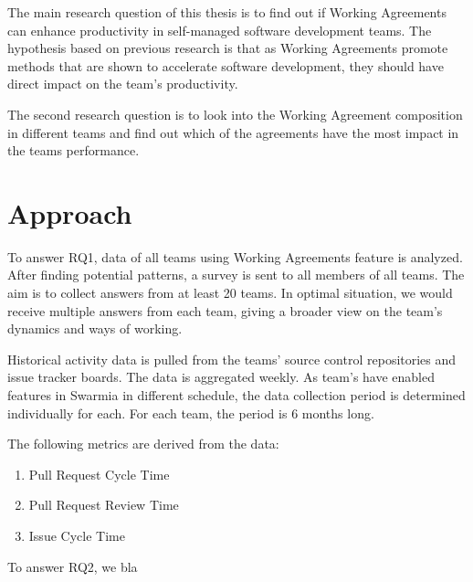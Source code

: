 The main research question of this thesis is to find out if Working Agreements can enhance productivity in self-managed software development teams. The hypothesis based on previous research is that as Working Agreements promote methods that are shown to accelerate software development, they should have direct impact on the team's productivity.

The second research question is to look into the Working Agreement composition in different teams and find out which of the agreements have the most impact in the teams performance. 

\section{Approach}

To answer RQ1, data of all teams using Working Agreements feature is analyzed. After finding potential patterns, a survey is sent to all members of all teams. The aim is to collect answers from at least 20 teams. In optimal situation, we would receive multiple answers from each team, giving a broader view on the team's dynamics and ways of working. 

Historical activity data is pulled from the teams' source control repositories and issue tracker boards. The data is aggregated weekly. As team's have enabled features in Swarmia in different schedule, the data collection period is determined individually for each. For each team, the period is 6 months long. 

The following metrics are derived from the data:
\begin{enumerate}
\item Pull Request Cycle Time
\item Pull Request Review Time
\item Issue Cycle Time
\end{enumerate}

To answer RQ2, we bla





